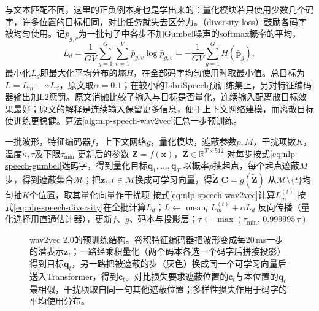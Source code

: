 与文本匹配不同，这里的正负例本身也是学出来的：量化模块若只使用少数几个码字，许多位置的目标相同，对比任务就失去区分力。（diversity loss）鼓励各码字被均匀使用。记$\bar p_{g,v}$为一批句子中各步不加Gumbel噪声的softmax概率的平均，
\begin{equation}
 L_d=\frac{1}{GV}\sum_{g=1}^{G}\sum_{v=1}^{V}\bar p_{g,v}\log\bar p_{g,v}
    =-\frac{1}{GV}\sum_{g=1}^{G}H(\bar{\bm p}_g),
 \label{eq:nlp-speech-diversity}
\end{equation}
最小化$L_d$即最大化平均分布的熵$H$，在全部码字均匀使用时取最小值。总目标为$L=L_m+\alpha L_d$，原文取$\alpha=0.1$；在较小的LibriSpeech预训练集上，另对特征编码器输出加L2惩罚。原文消融比较了输入与目标是否量化，连续输入配离散目标效果最好；原文的解释是连续输入保留更多信息，便于上下文网络建模，而离散目标使训练更稳健。算法\ref{alg:nlp-speech-wav2vec}汇总一步预训练。

\begin{algorithm}
  \label{alg:nlp-speech-wav2vec}
  \begin{algorithmic}[1]
    \Require 一批波形，特征编码器$f$，上下文网络$g$，量化模块，遮蔽参数$p,M$，干扰项数$K$，温度$\kappa,\tau$及下限$\tau_{\min}$
    \Ensure 更新后的参数
      \State $\bm Z=f(\bm x)$，$\bm Z\in\mathbb R^{T\times512}$ 
      \State 对每步按式\eqref{eq:nlp-speech-gumbel}选码字，得到量化目标$\bm q_1,\ldots,\bm q_T$ 
      \State 以概率$p$抽起点，每个起点遮蔽$M$步，得到遮蔽集合$\mathcal M$；把$\bm z_t,t\in\mathcal M$换成可学习向量，得$\tilde{\bm Z}$
      \State $\bm C=g(\tilde{\bm Z})$
        \State 从$\mathcal M\setminus\{t\}$均匀抽$K$个位置，取其量化向量作干扰项
        \State 按式\eqref{eq:nlp-speech-wav2vec}计算$L_m^{(t)}$
      \EndFor
    \EndFor
    \State 按式\eqref{eq:nlp-speech-diversity}在全批计算$L_d$；$L\gets\operatorname{mean}_t L_m^{(t)}+\alpha L_d$
    \State 反向传播（量化选择用直通估计器），更新$f$、$g$、码本与投影层；$\tau\gets\max(\tau_{\min},\,0.999995\,\tau)$
  \end{algorithmic}
\end{algorithm}

\begin{figure}[htbp]
  \centering
  
  \caption{wav2vec 2.0的预训练结构。卷积特征编码器把波形变成每20\,ms一步的潜表示$\bm z_t$；一路经乘积量化（两个码本各选一个码字后拼接投影）得到目标$\bm q_t$，另一路把被遮蔽的步（灰色）换成同一个可学习向量后送入Transformer，得到$\bm c_t$。对比损失要求遮蔽位置的$\bm c_t$与本位置的$\bm q_t$最相似，干扰项取自同一句其他遮蔽位置；多样性损失作用于码字的平均使用分布。}
  \label{fig:nlp-speech-wav2vec}
\end{figure}

